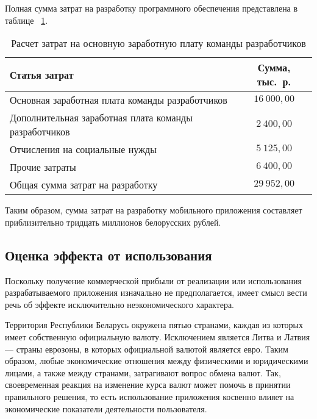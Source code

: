 Полная сумма затрат на разработку программного обеспечения представлена в таблице
~\ref{tbl:teo_sum_cost}.

\begin{table} [h!]
  \caption{
    Расчет затрат на основную заработную плату команды разработчиков
  }\label{tbl:teo_sum_cost}
  \begin{tabular}{| m{13.5cm} | c |}
    \hline

    \parbox{13.5cm}{
    \smallskip
    \centering Статья затрат
    \smallskip
    }
    &
      \parbox{2cm}{
      \smallskip
      \centering Сумма, тыс.~р.
    \smallskip
    } \\
    \hline

    Основная заработная плата команды разработчиков
    & \( 16 \: 000{,}00 \)\\
    \hline

    Дополнительная заработная плата команды разработчиков
    & \( 2 \: 400{,}00 \)\\
    \hline

    Отчисления на социальные нужды
    & \( 5 \: 125{,}00 \)\\
    \hline

    Прочие затраты
    & \( 6 \: 400{,}00 \)\\
    \hline

    Общая сумма затрат на разработку
    & \( 29 \: 952{,}00 \) \\
    \hline
  \end{tabular}
\end{table}

Таким образом, сумма затрат на разработку мобильного приложения
составляет приблизительно тридцать миллионов белорусских рублей.

\subsection{Оценка эффекта от использования}

Поскольку получение коммерческой прибыли от реализации или использования
разрабатываемого приложения изначально не предполагается,
имеет смысл вести речь об эффекте исключительно
неэкономического характера.

Территория Республики Беларусь окружена пятью странами, каждая из которых
имеет собственную официальную валюту. Исключением является Литва и Латвия ---
страны еврозоны, в которых официальной валютой является евро. Таким
образом, любые экономические отношения между физическими и юридическими лицами,
а также между странами, затрагивают вопрос обмена валют.
Так, своевременная реакция на изменение курса валют может помочь
в принятии правильного решения, то есть использование приложения
косвенно влияет на экономические показатели деятельности пользователя.
